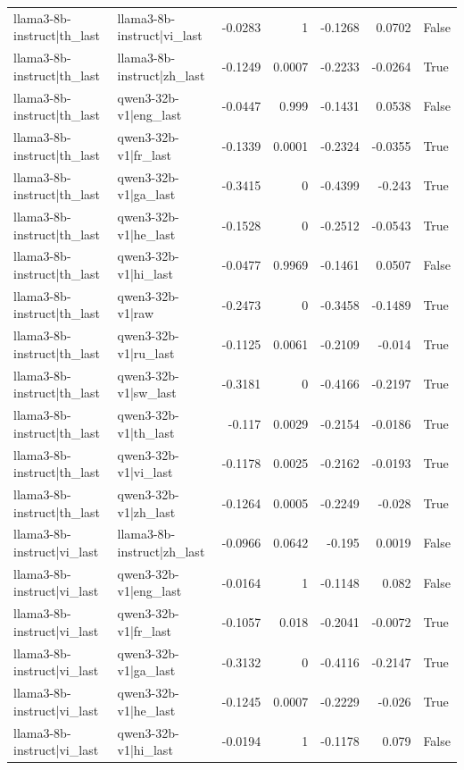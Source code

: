 \begin{table}
\begin{tabular}{l l r r r r l}
llama3-8b-instruct|th_last & llama3-8b-instruct|vi_last & -0.0283 & 1 & -0.1268 & 0.0702 & False \\
llama3-8b-instruct|th_last & llama3-8b-instruct|zh_last & -0.1249 & 0.0007 & -0.2233 & -0.0264 & True \\
llama3-8b-instruct|th_last & qwen3-32b-v1|eng_last & -0.0447 & 0.999 & -0.1431 & 0.0538 & False \\
llama3-8b-instruct|th_last & qwen3-32b-v1|fr_last & -0.1339 & 0.0001 & -0.2324 & -0.0355 & True \\
llama3-8b-instruct|th_last & qwen3-32b-v1|ga_last & -0.3415 & 0 & -0.4399 & -0.243 & True \\
llama3-8b-instruct|th_last & qwen3-32b-v1|he_last & -0.1528 & 0 & -0.2512 & -0.0543 & True \\
llama3-8b-instruct|th_last & qwen3-32b-v1|hi_last & -0.0477 & 0.9969 & -0.1461 & 0.0507 & False \\
llama3-8b-instruct|th_last & qwen3-32b-v1|raw & -0.2473 & 0 & -0.3458 & -0.1489 & True \\
llama3-8b-instruct|th_last & qwen3-32b-v1|ru_last & -0.1125 & 0.0061 & -0.2109 & -0.014 & True \\
llama3-8b-instruct|th_last & qwen3-32b-v1|sw_last & -0.3181 & 0 & -0.4166 & -0.2197 & True \\
llama3-8b-instruct|th_last & qwen3-32b-v1|th_last & -0.117 & 0.0029 & -0.2154 & -0.0186 & True \\
llama3-8b-instruct|th_last & qwen3-32b-v1|vi_last & -0.1178 & 0.0025 & -0.2162 & -0.0193 & True \\
llama3-8b-instruct|th_last & qwen3-32b-v1|zh_last & -0.1264 & 0.0005 & -0.2249 & -0.028 & True \\
llama3-8b-instruct|vi_last & llama3-8b-instruct|zh_last & -0.0966 & 0.0642 & -0.195 & 0.0019 & False \\
llama3-8b-instruct|vi_last & qwen3-32b-v1|eng_last & -0.0164 & 1 & -0.1148 & 0.082 & False \\
llama3-8b-instruct|vi_last & qwen3-32b-v1|fr_last & -0.1057 & 0.018 & -0.2041 & -0.0072 & True \\
llama3-8b-instruct|vi_last & qwen3-32b-v1|ga_last & -0.3132 & 0 & -0.4116 & -0.2147 & True \\
llama3-8b-instruct|vi_last & qwen3-32b-v1|he_last & -0.1245 & 0.0007 & -0.2229 & -0.026 & True \\
llama3-8b-instruct|vi_last & qwen3-32b-v1|hi_last & -0.0194 & 1 & -0.1178 & 0.079 & False \\

\end{tabular}
\end{table}
